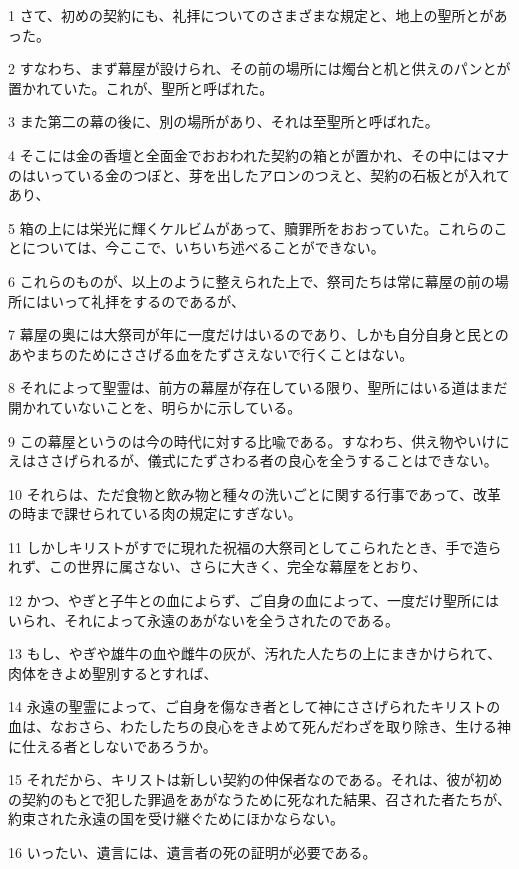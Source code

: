 \par 1 さて、初めの契約にも、礼拝についてのさまざまな規定と、地上の聖所とがあった。
\par 2 すなわち、まず幕屋が設けられ、その前の場所には燭台と机と供えのパンとが置かれていた。これが、聖所と呼ばれた。
\par 3 また第二の幕の後に、別の場所があり、それは至聖所と呼ばれた。
\par 4 そこには金の香壇と全面金でおおわれた契約の箱とが置かれ、その中にはマナのはいっている金のつぼと、芽を出したアロンのつえと、契約の石板とが入れてあり、
\par 5 箱の上には栄光に輝くケルビムがあって、贖罪所をおおっていた。これらのことについては、今ここで、いちいち述べることができない。
\par 6 これらのものが、以上のように整えられた上で、祭司たちは常に幕屋の前の場所にはいって礼拝をするのであるが、
\par 7 幕屋の奥には大祭司が年に一度だけはいるのであり、しかも自分自身と民とのあやまちのためにささげる血をたずさえないで行くことはない。
\par 8 それによって聖霊は、前方の幕屋が存在している限り、聖所にはいる道はまだ開かれていないことを、明らかに示している。
\par 9 この幕屋というのは今の時代に対する比喩である。すなわち、供え物やいけにえはささげられるが、儀式にたずさわる者の良心を全うすることはできない。
\par 10 それらは、ただ食物と飲み物と種々の洗いごとに関する行事であって、改革の時まで課せられている肉の規定にすぎない。
\par 11 しかしキリストがすでに現れた祝福の大祭司としてこられたとき、手で造られず、この世界に属さない、さらに大きく、完全な幕屋をとおり、
\par 12 かつ、やぎと子牛との血によらず、ご自身の血によって、一度だけ聖所にはいられ、それによって永遠のあがないを全うされたのである。
\par 13 もし、やぎや雄牛の血や雌牛の灰が、汚れた人たちの上にまきかけられて、肉体をきよめ聖別するとすれば、
\par 14 永遠の聖霊によって、ご自身を傷なき者として神にささげられたキリストの血は、なおさら、わたしたちの良心をきよめて死んだわざを取り除き、生ける神に仕える者としないであろうか。
\par 15 それだから、キリストは新しい契約の仲保者なのである。それは、彼が初めの契約のもとで犯した罪過をあがなうために死なれた結果、召された者たちが、約束された永遠の国を受け継ぐためにほかならない。
\par 16 いったい、遺言には、遺言者の死の証明が必要である。
